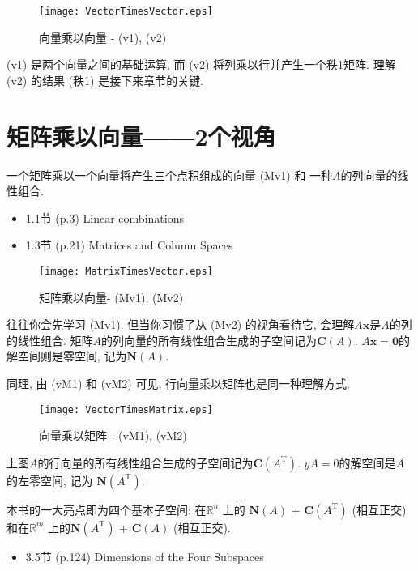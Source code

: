 \documentclass[letterpaper]{article}
\DeclareRobustCommand\transp{^{\mathrm{T}}}
\begin{document}
\begin{figure}[H]
  \centering
  \texttt{[image: VectorTimesVector.eps]}
  \caption{向量乘以向量 - (v1), (v2)}
\end{figure}

(v1) 是两个向量之间的基础运算, 而 (v2) 将列乘以行并产生一个秩1矩阵. 
理解 (v2) 的结果 (秩1) 是接下来章节的关键.

\section{矩阵乘以向量——2个视角}

一个矩阵乘以一个向量将产生三个点积组成的向量 (Mv1) 和
一种$A$的列向量的线性组合.

\begin{itemize}
  \item 1.1节 (p.3) Linear combinations
  \item 1.3节 (p.21) Matrices and Column Spaces
\end{itemize} 

\begin{figure}[H]
  \centering
  \texttt{[image: MatrixTimesVector.eps]}
  \caption{矩阵乘以向量- (Mv1), (Mv2)}
\end{figure}

往往你会先学习 (Mv1). 但当你习惯了从 (Mv2) 的视角看待它, 会理解$A\bm{x}$是$A$的列的线性组合. 
矩阵$A$的列向量的所有线性组合生成的子空间记为$\mathbf{C}(A)$. 
$A\bm{x}=\bm{0}$的解空间则是零空间, 记为$\mathbf{N}(A)$. 


同理, 由 (vM1) 和 (vM2) 可见, 行向量乘以矩阵也是同一种理解方式. 

\begin{figure}[H]
  \centering
  \texttt{[image: VectorTimesMatrix.eps]}
  \caption{向量乘以矩阵 - (vM1), (vM2)}
\end{figure}

上图$A$的行向量的所有线性组合生成的子空间记为$\mathbf{C}(A\transp)$. 
$yA=0$的解空间是$A$的左零空间, 记为 $\mathbf{N}(A\transp)$. 


本书的一大亮点即为四个基本子空间: 在$\mathbb{R}^n$ 上的
$\mathbf{N}(A)$ + $\mathbf{C}(A\transp)$ (相互正交) 
和在$\mathbb{R}^m$ 上的$\mathbf{N}(A\transp)$ + $\mathbf{C}(A)$ (相互正交). 


\begin{itemize}
  \item 3.5节 (p.124) Dimensions of the Four Subspaces
\end{itemize} 
\end{document}
